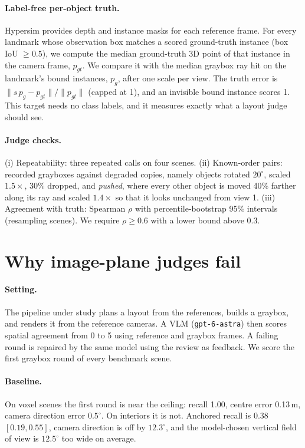 \documentclass[10pt,twocolumn]{article}
\begin{document}
\paragraph{Label-free per-object truth.} Hypersim provides depth and instance masks for each reference frame. For every landmark whose
observation box matches a scored ground-truth instance (box IoU $\ge 0.5$), we compute the median ground-truth 3D point of that
instance in the camera frame, $p_{gt}$. We compare it with the median graybox ray hit on the landmark's bound instances, $p_g$, after one
scale per view. The truth error is $\|s\,p_g-p_{gt}\|/\|p_{gt}\|$ (capped at 1), and an invisible bound instance scores 1. This target
needs no class labels, and it measures exactly what a layout judge should see.
\paragraph{Judge checks.} (i) Repeatability: three repeated calls on four scenes. (ii) Known-order pairs: recorded grayboxes against
degraded copies, namely objects rotated $20^\circ$, scaled $1.5\times$, 30\% dropped, and \emph{pushed}, where every other object is
moved 40\% farther along its ray and scaled $1.4\times$ so that it looks unchanged from view 1. (iii) Agreement with truth: Spearman
$\rho$ with percentile-bootstrap 95\% intervals (resampling scenes). We require $\rho\ge0.6$ with a lower bound above 0.3.

\section{Why image-plane judges fail}\label{sec:fail}
\paragraph{Setting.} The pipeline under study plans a layout from the references, builds a graybox, and renders it from the reference
cameras. A VLM (\texttt{gpt-6-astra}) then scores spatial agreement from 0 to 5 using reference and graybox frames. A failing round is
repaired by the same model using the review as feedback. We score the first graybox round of every benchmark scene.
\paragraph{Baseline.} On voxel scenes the first round is near the ceiling: recall 1.00, centre error 0.13\,m, camera direction error
$0.5^\circ$. On interiors it is not. Anchored recall is 0.38 $[0.19,0.55]$, camera direction is off by $12.3^\circ$, and the model-chosen
vertical field of view is $12.5^\circ$ too wide on average.
\end{document}
